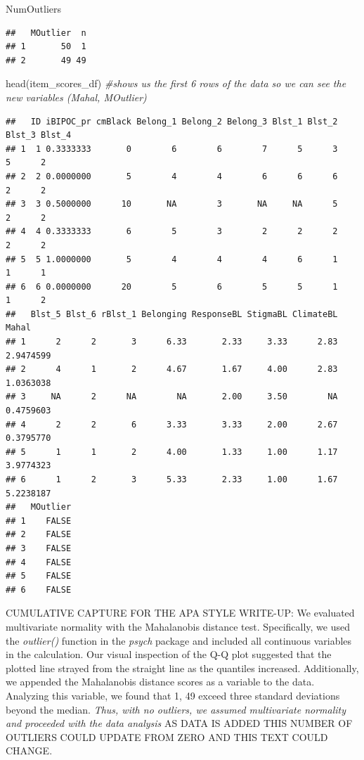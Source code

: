 \documentclass[
  11pt,
]{book}
\newenvironment{Shaded}{\begin{snugshade}}{\end{snugshade}}
\newcommand{\CommentTok}[1]{\textcolor[rgb]{0.56,0.35,0.01}{\textit{#1}}}
\newcommand{\FunctionTok}[1]{\textcolor[rgb]{0.00,0.00,0.00}{#1}}
\newcommand{\NormalTok}[1]{#1}
\begin{document}
\begin{Shaded}
\begin{Highlighting}[]
\NormalTok{NumOutliers}
\end{Highlighting}
\end{Shaded}

\begin{verbatim}
##   MOutlier  n
## 1       50  1
## 2       49 49
\end{verbatim}

\begin{Shaded}
\begin{Highlighting}[]
\FunctionTok{head}\NormalTok{(item\_scores\_df) }\CommentTok{\#shows us the first 6 rows of the data so we can see the new variables (Mahal, MOutlier)}
\end{Highlighting}
\end{Shaded}

\begin{verbatim}
##   ID iBIPOC_pr cmBlack Belong_1 Belong_2 Belong_3 Blst_1 Blst_2 Blst_3 Blst_4
## 1  1 0.3333333       0        6        6        7      5      3      5      2
## 2  2 0.0000000       5        4        4        6      6      6      2      2
## 3  3 0.5000000      10       NA        3       NA     NA      5      2      2
## 4  4 0.3333333       6        5        3        2      2      2      2      2
## 5  5 1.0000000       5        4        4        4      6      1      1      1
## 6  6 0.0000000      20        5        6        5      5      1      1      2
##   Blst_5 Blst_6 rBlst_1 Belonging ResponseBL StigmaBL ClimateBL     Mahal
## 1      2      2       3      6.33       2.33     3.33      2.83 2.9474599
## 2      4      1       2      4.67       1.67     4.00      2.83 1.0363038
## 3     NA      2      NA        NA       2.00     3.50        NA 0.4759603
## 4      2      2       6      3.33       3.33     2.00      2.67 0.3795770
## 5      1      1       2      4.00       1.33     1.00      1.17 3.9774323
## 6      1      2       3      5.33       2.33     1.00      1.67 5.2238187
##   MOutlier
## 1    FALSE
## 2    FALSE
## 3    FALSE
## 4    FALSE
## 5    FALSE
## 6    FALSE
\end{verbatim}

CUMULATIVE CAPTURE FOR THE APA STYLE WRITE-UP: We evaluated multivariate normality with the Mahalanobis distance test. Specifically, we used the \emph{outlier()} function in the \emph{psych} package and included all continuous variables in the calculation. Our visual inspection of the Q-Q plot suggested that the plotted line strayed from the straight line as the quantiles increased. Additionally, we appended the Mahalanobis distance scores as a variable to the data. Analyzing this variable, we found that 1, 49 exceed three standard deviations beyond the median. \emph{Thus, with no outliers, we assumed multivariate normality and proceeded with the data analysis} AS DATA IS ADDED THIS NUMBER OF OUTLIERS COULD UPDATE FROM ZERO AND THIS TEXT COULD CHANGE.
\end{document}
